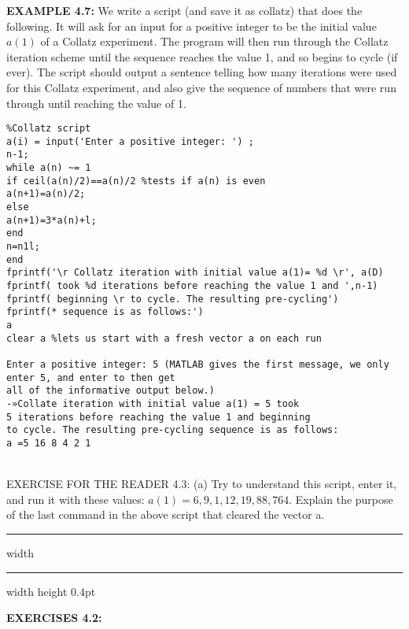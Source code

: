 \documentclass[../main.tex]{subfiles}
\begin{document}
\textbf{EXAMPLE 4.7:} We write a script (and save it as collatz) that does the following. It will ask for an input for a positive integer to be the initial value $a(1)$ of a Collatz experiment. The program will then run through the Collatz iteration scheme until the sequence reaches the value 1, and so begins to cycle (if ever). The script should output a sentence telling how many iterations were used for this Collatz experiment, and also give the sequence of numbers that were run through until reaching the value of 1.\\

\begin{verbatim}
%Collatz script
a(i) = input('Enter a positive integer: ') ;
n-1;
while a(n) ~= 1
if ceil(a(n)/2)==a(n)/2 %tests if a(n) is even
a(n+1)=a(n)/2;
else
a(n+1)=3*a(n)+l;
end
n=n1l;
end
fprintf('\r Collatz iteration with initial value a(1)= %d \r', a(D)
fprintf( took %d iterations before reaching the value 1 and ',n-1)
fprintf( beginning \r to cycle. The resulting pre-cycling')
fprintf(* sequence is as follows:')
a
clear a %lets us start with a fresh vector a on each run

Enter a positive integer: 5 (MATLAB gives the first message, we only enter 5, and enter to then get
all of the informative output below.)
-»Collate iteration with initial value a(1) = 5 took
5 iterations before reaching the value 1 and beginning
to cycle. The resulting pre-cycling sequence is as follows:
a =5 16 8 4 2 1 
\end{verbatim}\\


EXERCISE FOR THE READER 4.3: (a) Try to understand this script, enter it, and run it with these values: $a(1)=6,9,1,12,19,88,764$. Explain the purpose of the last command in the above script that cleared the vector a.\\

\hrule width \hsize \kern 1pt \hrule width \hsize height 0.4pt

\hspace{0.1cm}

\textbf{EXERCISES 4.2: }
\end{document}
